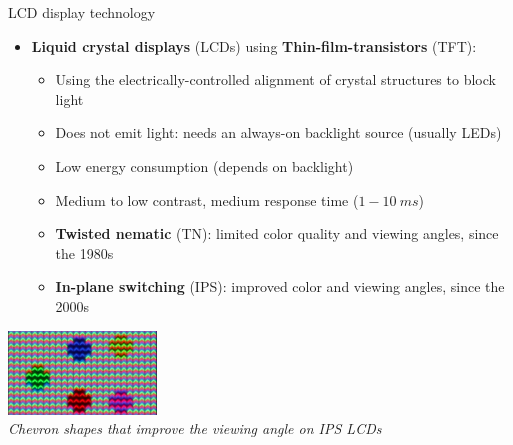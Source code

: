 \begin{frame}{LCD display technology}
  \begin{itemize}
  \item \textbf{Liquid crystal displays} (LCDs) using \textbf{Thin-film-transistors} (TFT):
    \begin{itemize}
    \item Using the electrically-controlled alignment of crystal structures to block light
    \item Does not emit light: needs an always-on backlight source (usually LEDs)
    \item Low energy consumption (depends on backlight)
    \item Medium to low contrast, medium response time (\(1-10~ms\))
    \item \textbf{Twisted nematic} (TN): limited color quality and viewing angles, since the 1980s
    \item \textbf{In-plane switching} (IPS): improved color and viewing angles, since the 2000s
    \end{itemize}
  \end{itemize}

  \begin{center}
  \includegraphics[height=6em]{slides/graphics-hardware/lcd-ips-shape.jpg}\\
  \textit{\small Chevron shapes that improve the viewing angle on IPS LCDs}
  \end{center}
\end{frame}

